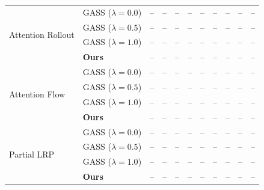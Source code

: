 \begin{table}[t]
{\begin{tabular}{ll|ccc|ccc|ccc}
\multirow{4}{*}{Attention Rollout}
& GASS ($\lambda=0.0$) & -- & -- & -- & -- & -- & -- & -- & -- & -- \\
& GASS ($\lambda=0.5$) & -- & -- & -- & -- & -- & -- & -- & -- & -- \\
& GASS ($\lambda=1.0$) & -- & -- & -- & -- & -- & -- & -- & -- & -- \\
& \textbf{Ours} & -- & -- & -- & -- & -- & -- & -- & -- & -- \\
\midrule

\multirow{4}{*}{Attention Flow}
& GASS ($\lambda=0.0$) & -- & -- & -- & -- & -- & -- & -- & -- & -- \\
& GASS ($\lambda=0.5$) & -- & -- & -- & -- & -- & -- & -- & -- & -- \\
& GASS ($\lambda=1.0$) & -- & -- & -- & -- & -- & -- & -- & -- & -- \\
& \textbf{Ours} & -- & -- & -- & -- & -- & -- & -- & -- & -- \\
\midrule

\multirow{4}{*}{Partial LRP}
& GASS ($\lambda=0.0$) & -- & -- & -- & -- & -- & -- & -- & -- & -- \\
& GASS ($\lambda=0.5$) & -- & -- & -- & -- & -- & -- & -- & -- & -- \\
& GASS ($\lambda=1.0$) & -- & -- & -- & -- & -- & -- & -- & -- & -- \\
& \textbf{Ours} & -- & -- & -- & -- & -- & -- & -- & -- & -- \\

\bottomrule
\end{tabular}
}
\end{table}
